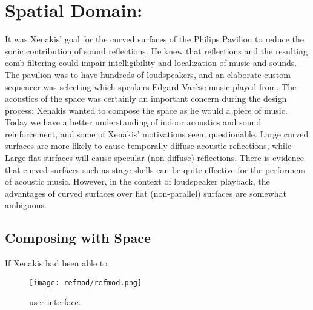 \chapter{Spatial Domain: }
\label{ch:ref-mod}

It was Xenakis' goal for the curved surfaces of the Philips Pavilion
to reduce the sonic contribution of sound
reflections.\cite{philips1958} He knew that reflections and the
resulting comb filtering could impair intelligibility and localization
of music and sounds.  The pavilion was to have hundreds of
loudspeakers, and an elaborate custom sequencer was selecting which
speakers Edgard Var\`{e}se music played from. The acoustics of the
space was certainly an important concern during the design process:
Xenakis wanted to compose the space as he would a piece of music.
Today we have a better understanding of indoor acoustics and sound
reinforcement, and some of Xenakis' motivations seem
questionable. Large curved surfaces are more likely to cause
temporally diffuse acoustic reflections, while Large flat surfaces
will cause specular (non-diffuse) reflections. There is evidence that
curved surfaces such as stage shells can be quite effective for the
performers of acoustic music.\cite{DAntonio1991} However, in the
context of loudspeaker playback, the advantages of curved surfaces
over flat (non-parallel) surfaces are somewhat ambiguous.\cite{Cox2006}

\section{Composing with Space}
\label{sec:composing-with-space}
If Xenakis had been able to 

\begin{figure*}[]
  \texttt{[image: refmod/refmod.png]}
  \caption[Tempo Transition]{ user interface.}
  \label{fig:basic-tempo-change}
\end{figure*}



